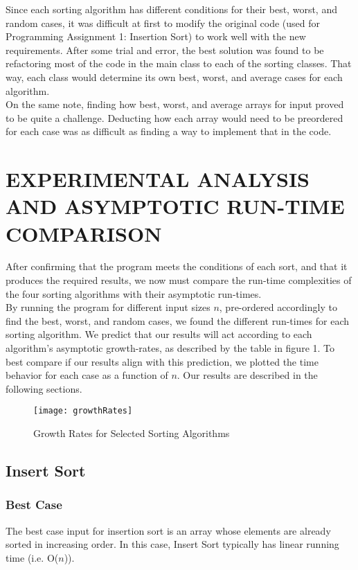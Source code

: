 \documentclass[12pt]{article}
\begin{document}
Since each sorting algorithm has different conditions for their best, worst, and random cases, it was difficult at first to modify the original code (used for Programming Assignment 1: Insertion Sort) to work well with the new requirements. After some trial and error, the best  solution was found to be refactoring most of the code in the main class to each of the sorting classes. That way, each class would determine its own best, worst, and average cases for each algorithm.\\

On the same note, finding how best, worst, and average arrays for input proved to be quite a challenge. Deducting how each array would need to be preordered for each case was as difficult as finding a way to implement that in the code.\\
 
\pagebreak

\section*{EXPERIMENTAL ANALYSIS AND ASYMPTOTIC RUN-TIME COMPARISON}
After confirming that the program meets the conditions of each sort, and that it produces the required results, we now must compare the run-time complexities of the four sorting algorithms with their asymptotic run-times.\\ 

By running the program  for different input sizes $n$, pre-ordered accordingly to find the best, worst, and random cases, we found the different run-times for each sorting algorithm. We predict that our results will act according to each algorithm's asymptotic growth-rates, as described by the table in figure 1. To best compare if our results align with this prediction, we plotted the time behavior for each case as a function of $n$. Our results are described in the following sections.\\ 

\begin{figure}
	\texttt{[image: growthRates]}
	\caption{Growth Rates for Selected Sorting Algorithms}
\end{figure}

\subsection*{Insert Sort}

\subsubsection*{Best Case}
The best case input for insertion sort is an array whose elements are already sorted in increasing order. In this case, Insert Sort typically has linear running time (i.e. O($n$)).\\
\end{document}
